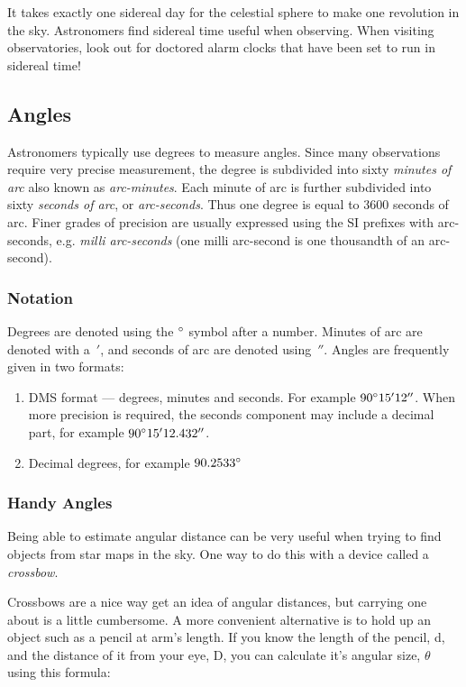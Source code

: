 It takes exactly one sidereal day for the celestial sphere to make one
revolution in the sky. Astronomers find sidereal time useful when
observing. When visiting observatories, look out for doctored alarm
clocks that have been set to run in sidereal time!

\subsection{Angles}\label{angles}

Astronomers typically use degrees to measure angles. Since many
observations require very precise measurement, the degree is subdivided
into sixty \emph{minutes of arc} also known as \emph{arc-minutes}. Each
minute of arc is further subdivided into sixty \emph{seconds of arc}, or
\emph{arc-seconds}. Thus one degree is equal to 3600 seconds of arc.
Finer grades of precision are usually expressed using the SI prefixes
with arc-seconds, e.g. \emph{milli arc-seconds} (one milli arc-second is
one thousandth of an arc-second).

\subsubsection{Notation}\label{notation}

Degrees are denoted using the $\degree$ symbol after a number. Minutes of arc are denoted with a~$'$, and seconds of arc are denoted using~$''$. Angles are frequently given in two formats:

\begin{enumerate}
\item
  DMS format --- degrees, minutes and seconds. For example $90\degree15'12''$.
  When more precision is required, the seconds component may include a
  decimal part, for example $90\degree15'12.432''$.
\item
  Decimal degrees, for example $90.2533\degree$
\end{enumerate}

\subsubsection{Handy Angles}
\label{sec:concepts:units:angles:handyAngles}

Being able to estimate angular distance can be very useful when trying
to find objects from star maps in the sky. One way to do this with a
device called a \emph{crossbow}.

Crossbows are a nice way get an idea of angular distances, but carrying
one about is a little cumbersome. A more convenient alternative is to
hold up an object such as a pencil at arm's length. If you know the
length of the pencil, d, and the distance of it from your eye, D, you
can calculate it's angular size, $\theta$ using this formula:

